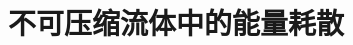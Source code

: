 \documentclass[12pt,a4paper]{article}
\begin{document}
\section{不可压缩流体中的能量耗散}























































\end{document}
